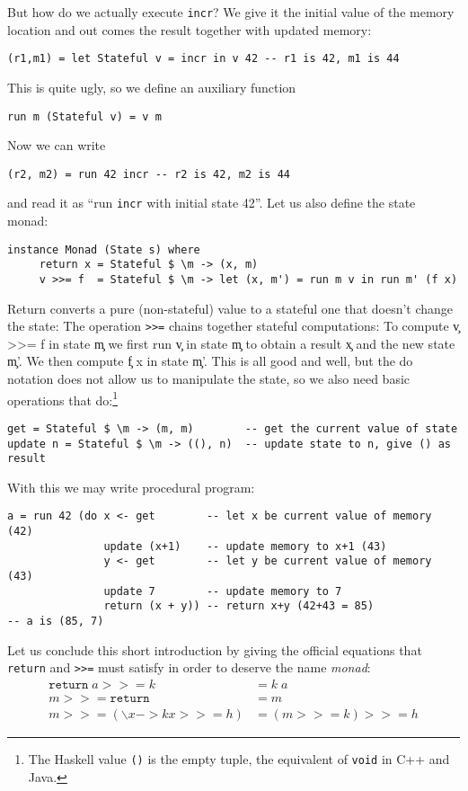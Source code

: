 \documentclass[a4paper,10pt]{article}
\newcommand{\cc}[1]{\lstinline{#1}}
\begin{document}
But how do we actually execute \cc{incr}? We give it the initial value of the memory location and out comes the result together with updated memory:
%
\begin{lstlisting}
(r1,m1) = let Stateful v = incr in v 42 -- r1 is 42, m1 is 44
\end{lstlisting}
%
This is quite ugly, so we define an auxiliary function
%
\begin{lstlisting}
run m (Stateful v) = v m
\end{lstlisting}
%
Now we can write
%
\begin{lstlisting}
(r2, m2) = run 42 incr -- r2 is 42, m2 is 44
\end{lstlisting}
%
and read it as ``run \cc{incr} with initial state 42''. Let us also define the state monad:
%
\begin{lstlisting}
instance Monad (State s) where
     return x = Stateful $ \m -> (x, m)
     v >>= f  = Stateful $ \m -> let (x, m') = run m v in run m' (f x)
  \end{lstlisting}
Return converts a pure (non-stateful) value to a stateful one that doesn't change the state:
The operation \cc{>>=} chains together stateful computations:
%
To compute \c{v >>= f} in state \c{m} we first run \c{v} in state \c{m} to obtain a result \c{x} and the new state \c{m'}. We then compute \c{f x} in state \c{m'}. This is all good and well, but the do notation does not allow us to manipulate the state, so we also need basic operations that do:\footnote{The Haskell value \cc{()} is the empty tuple, the equivalent of \cc{void} in C++ and Java.}
%
\begin{lstlisting}
get = Stateful $ \m -> (m, m)        -- get the current value of state
update n = Stateful $ \m -> ((), n)  -- update state to n, give () as result
\end{lstlisting}
%
With this we may write procedural program:
%
\begin{lstlisting}
a = run 42 (do x <- get        -- let x be current value of memory (42)
               update (x+1)    -- update memory to x+1 (43)
               y <- get        -- let y be current value of memory (43)
               update 7        -- update memory to 7
               return (x + y)) -- return x+y (42+43 = 85)
-- a is (85, 7)  
\end{lstlisting}
%
Let us conclude this short introduction by giving the official equations that \cc{return} and \cc{>>=} must satisfy in order to deserve the name \emph{monad}:
%
\begin{align*}
  \mathtt{return}\; a \mathtt{{>}{>}{=}} k &= k\; a \\
  m \mathtt{{>}{>}{=}} \mathtt{return}              &=   m \\
  m \mathtt{{>}{>}{=}} (\backslash x -> k x \mathtt{{>}{>}{=}} h)   &=   (m \mathtt{{>}{>}{=}} k) \mathtt{{>}{>}{=}} h
\end{align*}
\end{document}
